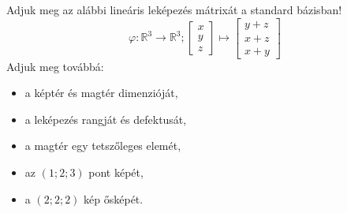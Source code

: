 \begin{exercise}{%
    Adjuk meg az alábbi lineáris leképezés mátrixát a standard bázisban!
  }
  \[
    \varphi: \mathbb R^3 \rightarrow \mathbb R^3;
    \begin{bmatrix}
      x \\ y \\ z
    \end{bmatrix} \mapsto \begin{bmatrix}
      y + z \\
      x + z \\
      x + y
    \end{bmatrix}
  \]
  Adjuk meg továbbá:
  \begin{itemize}
    \item a képtér és magtér dimenzióját,
    \item a leképezés rangját és defektusát,
    \item a magtér egy tetszőleges elemét,
    \item az $(1; 2; 3)$ pont képét,
    \item a $(2; 2; 2)$ kép ősképét.
  \end{itemize}

\end{exercise}
